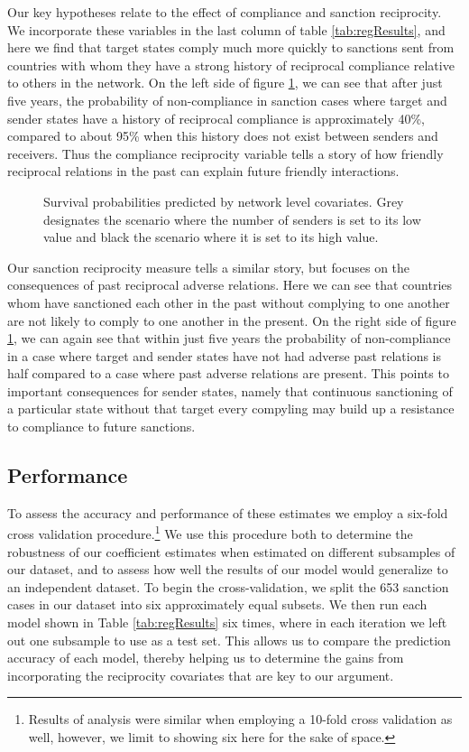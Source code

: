 Our key hypotheses relate to the effect of compliance and sanction reciprocity. We incorporate these variables in the last column of table \ref{tab:regResults}, and here we find that target states comply much more quickly to sanctions sent from countries with whom they have a strong history of reciprocal compliance relative to others in the network. On the left side of figure \ref{fig:surv3}, we can see that after just five years, the probability of non-compliance in sanction cases where target and sender states have a history of reciprocal compliance is approximately 40\%, compared to about 95\% when this history does not exist between senders and receivers. Thus the compliance reciprocity variable tells a story of how friendly reciprocal relations in the past can explain future friendly interactions. 

\begin{figure}[ht]
	\centering
	\caption{Survival probabilities predicted by network level covariates. Grey designates the scenario where the number of senders is set to its low value and black the scenario where it is set to its high value.}
	\resizebox{1\textwidth}{!}{}	
	\label{fig:surv3}	
\end{figure}
\FloatBarrier

Our sanction reciprocity measure tells a similar story, but focuses on the consequences of past reciprocal adverse relations. Here we can see that countries whom have sanctioned each other in the past without complying to one another are not likely to comply to one another in the present. On the right side of figure \ref{fig:surv3}, we can again see that within just five years the probability of non-compliance in a case where target and sender states have not had adverse past relations is half compared to a case where past adverse relations are present. This points to important consequences for sender states, namely that continuous sanctioning of a particular state without that target every compyling  may build up a resistance to compliance to future sanctions. 

\subsection*{Performance}

To assess the accuracy and performance of these estimates we employ a six-fold cross validation procedure.\footnote{Results of analysis were similar when employing a 10-fold cross validation as well, however, we limit to showing six here for the sake of space.} We use this procedure both to determine the robustness of our coefficient estimates when estimated on different subsamples of our dataset, and to assess how well the results of our model would generalize to an independent dataset. To begin the cross-validation, we split the 653 sanction cases in our dataset into six approximately equal subsets. We then run each model shown in Table \ref{tab:regResults} six times, where in each iteration we left out one subsample to use as a test set. This allows us to compare the prediction accuracy of each model, thereby helping us to determine the gains from incorporating the reciprocity covariates that are key to our argument.

